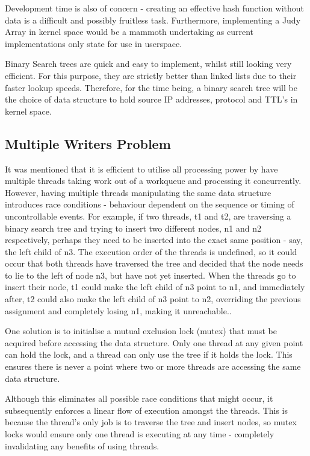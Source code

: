 \documentclass[twocolumn,10pt]{asme2ej}
\begin{document}
Development time is also of concern - creating an effective hash function without data is a difficult and possibly fruitless task. Furthermore, implementing a Judy Array in kernel space would be a mammoth undertaking as current implementations only state for use in userspace.

Binary Search trees are quick and easy to implement, whilst still looking very efficient. For this purpose, they are strictly better than linked lists due to their faster lookup speeds. Therefore, for the time being, a binary search tree will be the choice of data structure to hold source IP addresses, protocol and TTL's in kernel space.

\subsection{Multiple Writers Problem}

It was mentioned that it is efficient to utilise all processing power by have multiple threads taking work out of a workqueue and processing it concurrently. However, having multiple threads manipulating the same data structure introduces race conditions - behaviour dependent on the sequence or timing of uncontrollable events. For example, if two threads, t1 and t2, are traversing a binary search tree and trying to insert two different nodes, n1 and n2 respectively, perhaps they need to be inserted into the exact same position - say, the left child of n3. The execution order of the threads is undefined, so it could occur that both threads have traversed the tree and decided that the node needs to lie to the left of node n3, but have not yet inserted. When the threads go to insert their node, t1 could make the left child of n3 point to n1, and immediately after, t2 could also make the left child of n3 point to n2, overriding the previous assignment and completely losing n1, making it unreachable.. 

One solution is to initialise a mutual exclusion lock (mutex) that must be acquired before accessing the data structure. Only one thread at any given point can hold the lock, and a thread can only use the tree if it holds the lock. This ensures there is never a point where two or more threads are accessing the same data structure.

Although this eliminates all possible race conditions that might occur, it subsequently enforces a linear flow of execution amongst the threads. This is because the thread's only job is to traverse the tree and insert nodes, so mutex locks would ensure only one thread is executing at any time - completely invalidating any benefits of using threads.
\end{document}
